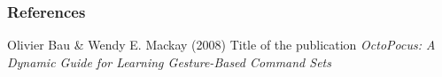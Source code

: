 \documentclass{beamer}
\begin{document}

\begin{frame}
\frametitle{References}
\footnotesize{
\begin{thebibliography}{99} %
 Olivier Bau \& Wendy E. Mackay (2008)
\newblock Title of the publication
\newblock \emph{OctoPocus: A Dynamic Guide for Learning Gesture-Based Command Sets} 
\end{thebibliography}
}
\end{frame}
\end{document}
